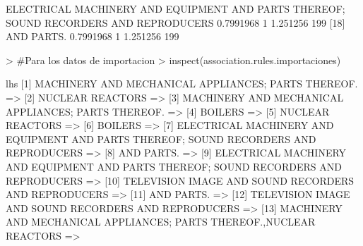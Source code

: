 \documentclass [a4paper] {article}
\begin{document}
{\begin{Schunk}
\begin{Soutput}
[17] {ELECTRICAL MACHINERY AND EQUIPMENT AND PARTS THEREOF; SOUND RECORDERS AND REPRODUCERS} 0.7991968 1          1.251256 199  
[18] {AND PARTS.}                                                                            0.7991968 1          1.251256 199  
\end{Soutput}
\begin{Sinput}
> #Para los datos de importacion
> inspect(association.rules.importaciones)
\end{Sinput}
\begin{Soutput}
     lhs                                                                                                                                            
[1]  {MACHINERY AND MECHANICAL APPLIANCES; PARTS THEREOF.}                                                                                        =>
[2]  {NUCLEAR REACTORS}                                                                                                                           =>
[3]  {MACHINERY AND MECHANICAL APPLIANCES; PARTS THEREOF.}                                                                                        =>
[4]  {BOILERS}                                                                                                                                    =>
[5]  {NUCLEAR REACTORS}                                                                                                                           =>
[6]  {BOILERS}                                                                                                                                    =>
[7]  {ELECTRICAL MACHINERY AND EQUIPMENT AND PARTS THEREOF; SOUND RECORDERS AND REPRODUCERS}                                                      =>
[8]  {AND PARTS.}                                                                                                                                 =>
[9]  {ELECTRICAL MACHINERY AND EQUIPMENT AND PARTS THEREOF; SOUND RECORDERS AND REPRODUCERS}                                                      =>
[10] {TELEVISION IMAGE AND SOUND RECORDERS AND REPRODUCERS}                                                                                       =>
[11] {AND PARTS.}                                                                                                                                 =>
[12] {TELEVISION IMAGE AND SOUND RECORDERS AND REPRODUCERS}                                                                                       =>
[13] {MACHINERY AND MECHANICAL APPLIANCES; PARTS THEREOF.,NUCLEAR REACTORS}                                                                       =>

\end{Soutput}
\end{Schunk}}
\end{document}
